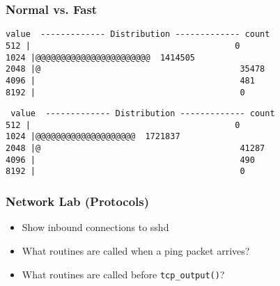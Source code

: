 \documentclass[pdftex]{beamer}
\begin{document}
\begin{frame}[fragile]
  \frametitle{Normal vs. Fast}
\begin{verbatim}
value  ------------- Distribution ------------- count    
512 |                                         0        
1024 |@@@@@@@@@@@@@@@@@@@@@@@  1414505  
2048 |@                                        35478    
4096 |                                         481      
8192 |                                         0        
\end{verbatim}

\begin{verbatim}
 value  ------------- Distribution ------------- count    
512 |                                         0        
1024 |@@@@@@@@@@@@@@@@@@@@  1721837  
2048 |@                                        41287    
4096 |                                         490      
8192 |                                         0        
\end{verbatim}
\end{frame}


\begin{frame}[fragile]
  \frametitle{Network Lab (Protocols)}
  \begin{itemize}
  \item Show inbound connections to sshd
  \item What routines are called when a ping packet arrives?
  \item What routines are called before \verb+tcp_output()+?
  \end{itemize}
\end{frame}
\end{document}
